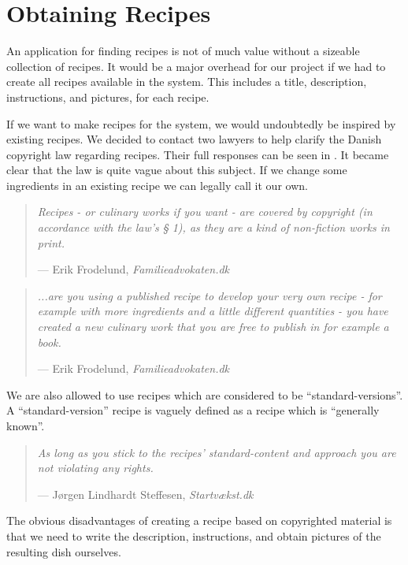 \section{Obtaining Recipes}
An application for finding recipes is not of much value without a sizeable collection of recipes. It would be a major overhead for our project if we had to create all recipes available in the system. This includes a title, description, instructions, and pictures, for each recipe.

If we want to make recipes for the system, we would undoubtedly be inspired by existing recipes. We decided to contact two lawyers to help clarify the Danish copyright law regarding recipes. Their full responses can be seen in . It became clear that the law is quite vague about this subject. If we change some ingredients in an existing recipe we can legally call it our own.
\begin{quote}
\textit{Recipes - or culinary works if you want - are covered by copyright (in accordance with the law's § 1), as they are a kind of non-fiction works in print.}\par\raggedleft--- \textup{Erik Frodelund}, \textit{Familieadvokaten.dk}
\end{quote}
\begin{quote}

\textit{...are you using a published recipe to develop your very own recipe - for example with more ingredients and a little different quantities - you have created a new culinary work that you are free to publish in for example a book.}\par\raggedleft--- \textup{Erik Frodelund}, \textit{Familieadvokaten.dk}
\end{quote}
We are also allowed to use recipes which are considered to be ``standard-versions''. A ``standard-version'' recipe is vaguely defined as a recipe which is ``generally known''.
\begin{quote}
\textit{As long as you stick to the recipes' standard-content and approach you are not violating any rights.}\par\raggedleft--- \textup{Jørgen Lindhardt Steffesen}, \textit{Startvækst.dk}
\end{quote}
The obvious disadvantages of creating a recipe based on copyrighted material is that we need to write the description, instructions, and obtain pictures of the resulting dish ourselves.

